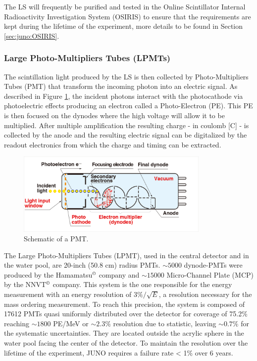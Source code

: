 \documentclass[../main.tex]{subfiles}
\begin{document}
The LS will frequently be purified and tested in the Online Scintillator Internal Radioactivity Investigation System (OSIRIS) \cite{juno_collaboration_design_2021} to ensure that the requirements are kept during the lifetime of the experiment, more details to be found in Section \ref{sec:juno:OSIRIS}.

\subsubsection{Large Photo-Multipliers Tubes (LPMTs)}
\label{sec:juno:LPMT}

The scintillation light produced by the LS is then collected by Photo-Multipliers Tubes (PMT) that transform the incoming photon into an electric signal. As described in Figure \ref{fig:juno:pmt-schem}, the incident photons interact with the photocathode via photoelectric effects producing an electron called a Photo-Electron (PE). This PE is then focused on the dynodes where the high voltage will allow it to be multiplied. After multiple amplification the resulting charge - in coulomb [C] - is collected by the anode and the resulting electric signal can be digitalized by the readout electronics from which the charge and timing can be extracted.

\begin{figure}[ht]
  \centering
  \includegraphics[height=4cm]{images/juno/pmt_schematic.png}
  \caption{Schematic of a PMT.}
  \label{fig:juno:pmt-schem}
\end{figure}

The Large Photo-Multipliers Tubes (LPMT), used in the central detector and in the water pool, are 20-inch (50.8 cm) radius PMTs. $\sim 5000$ dynode-PMTs \cite{noauthor_photomultiplier_nodate} were produced by the Hamamatsu$^{\copyright}$ company and $\sim 15000$ Micro-Channel Plate (MCP) \cite{abusleme_mass_2022} by the NNVT$^{\copyright}$ company. This system is the one responsible for the energy measurement with an energy resolution of $3\%/\sqrt{E}$, a resolution necessary for the mass ordering measurement. To reach this precision, the system is composed of 17612 PMTs quasi uniformly distributed over the detector for coverage of 75.2\% reaching $\sim 1800$ PE/MeV or $\sim 2.3 \%$ resolution due to statistic, leaving $\sim 0.7\%$ for the systematic uncertainties. They are located outside the acrylic sphere in the water pool facing the center of the detector.
To maintain the resolution over the lifetime of the experiment, JUNO requires a failure rate < 1\% over 6 years.
\end{document}
